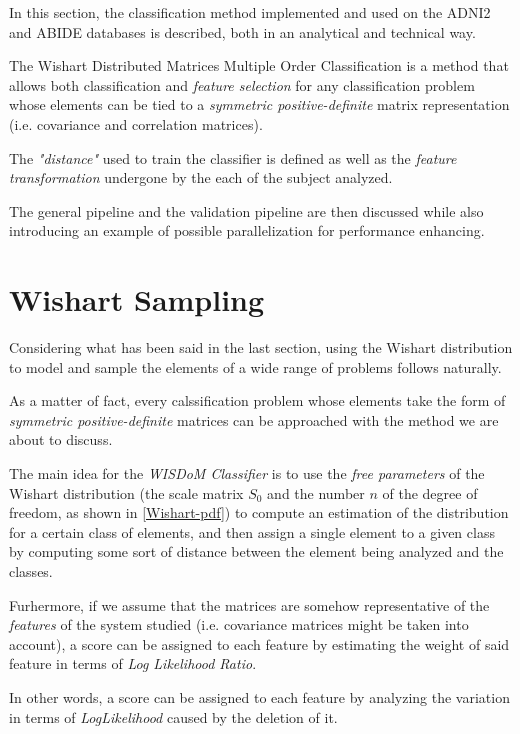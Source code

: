 \documentclass[12pt,openright,twoside,a4paper]{book}
\begin{document}
In this section, the classification method implemented and used on the ADNI2 and ABIDE databases is described, both in an analytical and technical way.
\vspace{5mm}

The Wishart Distributed Matrices Multiple Order Classification is a method that allows both classification and \textit{feature selection} for any classification problem whose elements can be tied to a \textit{symmetric positive-definite} matrix representation (i.e. covariance and correlation matrices).

 The \textit{"distance"} used to train the classifier is defined as well as the \textit{feature transformation} undergone by the each of the subject analyzed.

The general pipeline and the validation pipeline are then discussed while also introducing an example of possible parallelization for performance enhancing.

\section{Wishart Sampling}

Considering what has been said in the last section, using the Wishart distribution to model and sample the elements of a wide range of problems follows naturally.

As a matter of fact, every calssification problem whose elements take the form of \textit{symmetric positive-definite} matrices can be approached with the method we are about to discuss.

The main idea for the \textit{WISDoM Classifier} is to use the \textit{free parameters} of the Wishart distribution (the scale matrix $S_0$ and the number $n$ of the degree of freedom, as shown in \ref{Wishart-pdf}) to compute an estimation of the distribution for a certain class of elements, and then assign a single element to a given class by computing some sort of distance between the element being analyzed and the classes.

Furhermore, if we assume that the matrices are somehow representative of the \textit{features} of the system studied (i.e. covariance  matrices might be taken into account), a score can be assigned to each feature by estimating the weight of said feature in terms of \textit{Log Likelihood Ratio}.

In other words, a score can be assigned to each feature by analyzing the variation in terms of \textit{LogLikelihood} caused by the deletion of it. 
\end{document}
